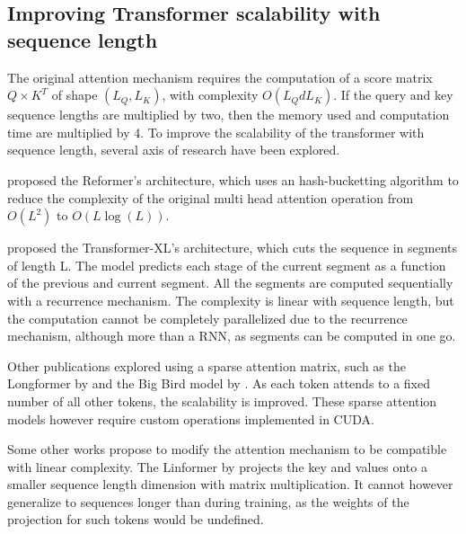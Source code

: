 \subsection{Improving Transformer scalability with sequence
length}

The original attention mechanism requires the computation of a score
matrix $Q \times K^T$ of shape $(L_Q, L_K)$, with complexity
$O(L_QdL_K)$. If the query and key sequence lengths are multiplied by
two, then the memory used and computation time are multiplied by 4. To
improve the scalability of the transformer with sequence length, several axis of research have been explored.

\citet{kitaev2020reformer} proposed
the Reformer's architecture, which uses an hash-bucketting algorithm to
reduce the complexity of the original multi head attention operation
from $O(L^2)$ to $O(L\log(L))$.

\citet{dai2019transformerxl} proposed the
Transformer-XL's architecture, which cuts the sequence in segments of
length L. The model predicts each stage of the current segment as a
function of the previous and current segment. All the segments are
computed sequentially with a recurrence mechanism. The complexity is linear
with sequence length, but the computation cannot be completely
 parallelized due to the recurrence mechanism, although more than a RNN,
as segments can be computed in one go.

Other publications explored using a sparse attention matrix, such as the
 Longformer by \citet{beltagy2020longformer} and the Big Bird model by
 \citet{zaheer2021big}. As each
token attends to a fixed number of all other tokens, the scalability is
improved. These sparse attention models however require custom
operations implemented in CUDA.

Some other works propose to modify the attention mechanism to be
 compatible with linear complexity. The Linformer by
\citet{wang2020linformer} projects the
 key and values onto a smaller sequence length dimension with matrix
 multiplication. It cannot however generalize to sequences longer than
 during training, as the weights of the projection for such tokens would
 be undefined.

